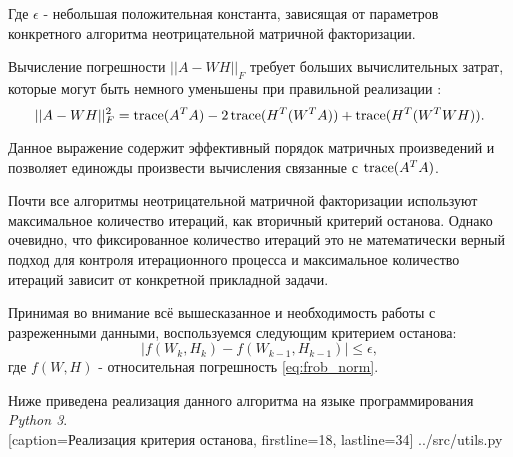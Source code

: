 Где $\epsilon$ - небольшая положительная константа, зависящая от параметров
конкретного алгоритма неотрицательной матричной факторизации.

Вычисление погрешности $||A - WH||_F$ требует больших вычислительных затрат,
которые могут быть немного уменьшены при правильной реализации \cite{berry}:
\begin{equation} \label{eq:termination}
  ||A - WH||^2_F = \operatorname{trace} (A^T A) - 2 \operatorname{trace}(H^T (W^T A)) + \operatorname{trace}(H^T (W^T W H)).
\end{equation}

Данное выражение содержит эффективный порядок матричных произведений и позволяет
единожды произвести вычисления связанные с $\operatorname{trace}(A^T A)$.

Почти все алгоритмы неотрицательной матричной факторизации используют
максимальное количество итераций, как вторичный критерий останова.
Однако очевидно, что фиксированное количество итераций это не математически верный
подход для контроля итерационного процесса и максимальное количество итераций зависит от конкретной прикладной задачи.

Принимая во внимание всё вышесказанное и необходимость работы с разреженными данными,
воспользуемся следующим критерием останова:
\begin{equation} \label{eq:termination}
  |f(W_k, H_k) - f(W_{k-1}, H_{k-1})| \leq \epsilon,
\end{equation}
 где $f(W, H)$ - относительная погрешность \eqref{eq:frob_norm}.



\newpage

Ниже приведена реализация данного алгоритма на языке программирования \textit{Python 3}.
\\


  [caption=Реализация критерия останова, firstline=18, lastline=34]
  {../src/utils.py}
